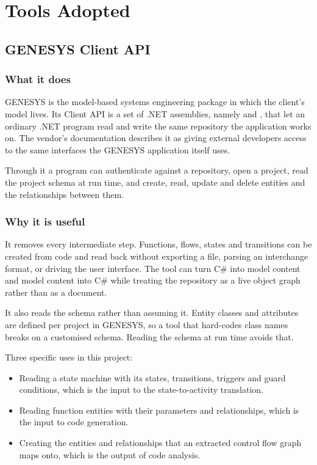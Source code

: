 \chapter{Tools Adopted}
\label{ch:adopted}

\section{GENESYS Client API}
\label{sec:genesys-api}

\subsection{What it does}

GENESYS is the model-based systems engineering package in which the client's
model lives. Its Client API is a set of .NET assemblies, namely
 and , that let an
ordinary .NET program read and write the same repository the application works
on. The vendor's documentation describes it as giving external developers access
to the same interfaces the GENESYS application itself uses.

Through it a program can authenticate against a repository, open a project, read
the project schema at run time, and create, read, update and delete entities and
the relationships between them.

\subsection{Why it is useful}

It removes every intermediate step. Functions, flows, states and transitions can
be created from code and read back without exporting a file, parsing an
interchange format, or driving the user interface. The tool can turn C\# into
model content and model content into C\# while treating the repository as a
live object graph rather than as a document.

It also reads the schema rather than assuming it. Entity classes and attributes
are defined per project in GENESYS, so a tool that hard-codes class names breaks
on a customised schema. Reading the schema at run time avoids that.

Three specific uses in this project:

\begin{itemize}[nosep]
	\item Reading a state machine with its states, transitions, triggers and
	      guard conditions, which is the input to the state-to-activity translation.
	\item Reading function entities with their parameters and relationships,
	      which is the input to code generation.
	\item Creating the entities and relationships that an extracted control flow
	      graph maps onto, which is the output of code analysis.
\end{itemize}

